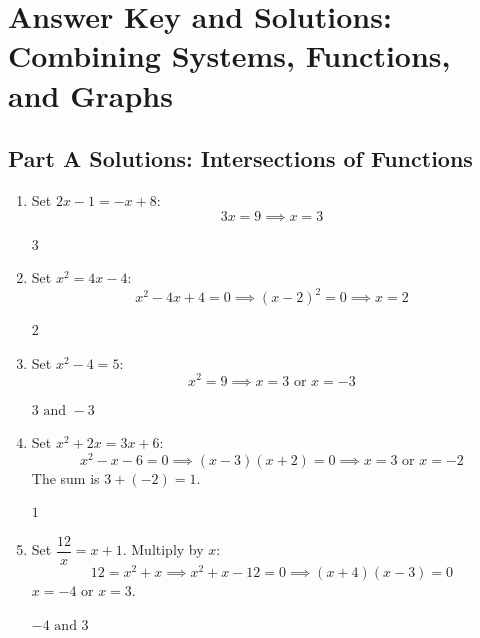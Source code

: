 \documentclass[14pt]{extarticle}
\begin{document}
\newpage

\section*{Answer Key and Solutions: Combining Systems, Functions, and Graphs}

\subsection*{Part A Solutions: Intersections of Functions}
\begin{enumerate}
  \item Set \(2x - 1 = -x + 8\):
  \[
  3x = 9 \implies x = 3
  \]

  \(\boxed{3}\)

  \item Set \(x^2 = 4x - 4\):
  \[
  x^2 - 4x + 4 = 0 \implies (x - 2)^2 = 0 \implies x = 2
  \]

  \(\boxed{2}\)

  \item Set \(x^2 - 4 = 5\):
  \[
  x^2 = 9 \implies x = 3 \text{ or } x = -3
  \]

  \(\boxed{3 \text{ and } -3}\)

  \item Set \(x^2 + 2x = 3x + 6\):
  \[
  x^2 - x - 6 = 0 \implies (x - 3)(x + 2) = 0 \implies x = 3 \text{ or } x = -2
  \]
  The sum is \(3 + (-2) = 1\).

  \(\boxed{1}\)

  \item Set \(\dfrac{12}{x} = x + 1\). Multiply by \(x\):
  \[
  12 = x^2 + x \implies x^2 + x - 12 = 0 \implies (x + 4)(x - 3) = 0
  \]
  \(x = -4\) or \(x = 3\).

  \(\boxed{-4 \text{ and } 3}\)
\end{enumerate}
\end{document}
